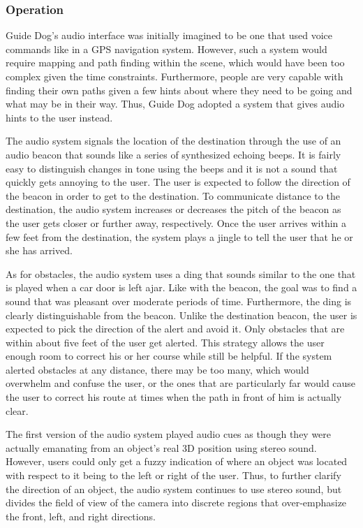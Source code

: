 \subsubsection{Operation}
\label{sec:technical-audio-op}

Guide Dog's audio interface was initially imagined to be one that used voice 
commands like in a GPS navigation system. However, such a system would require
mapping and path finding within the scene, which would have been too complex
given the time constraints. Furthermore, people are very capable with finding
their own paths given a few hints about where they need to be going and what
may be in their way. Thus, Guide Dog adopted a system that gives audio hints to
the user instead.

The audio system signals the location of the destination through the use of an
audio beacon that sounds like a series of synthesized echoing beeps. It is fairly
easy to distinguish changes in tone using the beeps and it is not a sound that
quickly gets annoying to the user. The user is expected to follow the direction
of the beacon in order to get to the destination. To communicate distance to the
destination, the audio system increases or decreases the pitch of the beacon as 
the user gets closer or further away, respectively. Once the user arrives within
a few feet from the destination, the system plays a jingle to tell the user that 
he or she has arrived. 

As for obstacles, the audio system uses a ding that sounds similar
to the one that is played when a car door is left ajar. Like with the beacon, 
the goal was to find a sound that was pleasant over moderate periods of time. 
Furthermore, the ding is clearly distinguishable from the beacon. Unlike the
destination beacon, the user is expected to pick the direction of the alert and
avoid it. Only obstacles that are within about five feet of the user get alerted.
This strategy allows the user enough room to correct his or her course while 
still be helpful. If the system alerted obstacles at any distance, there may be 
too many, which would overwhelm and confuse the user, or the ones that are 
particularly far would cause the user to correct his route at times when the 
path in front of him is actually clear.

The first version of the audio system played audio cues as though they were
actually emanating from an object's real 3D position using stereo sound. However,
users could only get a fuzzy indication of where an object was located with 
respect to it being to the left or right of the user. Thus, to further clarify 
the direction of an object, the audio system continues to use stereo sound, but
divides the field of view of the camera into discrete regions that over-emphasize 
the front, left, and right directions. 

